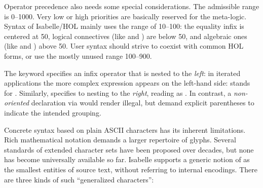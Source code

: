 \begin{isabellebody}
\begin{isamarkuptext}
  Operator precedence also needs some special considerations.  The
  admissible range is 0--1000.  Very low or high priorities are
  basically reserved for the meta-logic.  Syntax of Isabelle/HOL
  mainly uses the range of 10--100: the equality infix \isa{{\isacharequal}} is
  centered at 50, logical connectives (like \isa{{\isasymor}} and \isa{{\isasymand}}) are below 50, and algebraic ones (like \isa{{\isacharplus}} and \isa{{\isacharasterisk}}) above 50.  User syntax should strive to coexist with common
  HOL forms, or use the mostly unused range 100--900.

  The keyword  specifies an infix operator that is
  nested to the \emph{left}: in iterated applications the more complex
  expression appears on the left-hand side: 
  stands for .  Similarly,
   specifies to nesting to the \emph{right},
  reading  as .  In
  contrast, a \emph{non-oriented} declaration via 
  would render  illegal, but demand explicit
  parentheses to indicate the intended grouping.%
\end{isamarkuptext}%
\isamarkuptrue%
%
\isamarkuptrue%
%
\begin{isamarkuptext}%
Concrete syntax based on plain ASCII characters has its inherent
  limitations.  Rich mathematical notation demands a larger repertoire
  of glyphs.  Several standards of extended character sets have been
  proposed over decades, but none has become universally available so
  far.  Isabelle supports a generic notion of  as the
  smallest entities of source text, without referring to internal
  encodings.  There are three kinds of such ``generalized
  characters'':

  \begin{enumerate}


\end{enumerate}
\end{isamarkuptext}
\end{isabellebody}

